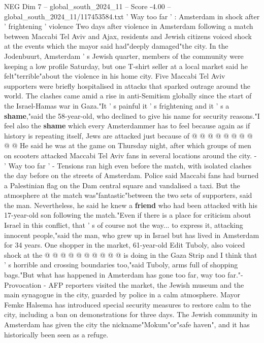 \begin{textsample}{NEG Dim 7 – global\_south\_2024\_11 – Score -4.00 – global\_south\_2024\_11/117453584.txt}  \label{ex:f7_neg_438}
' Way too far ' : Amsterdam in shock after ' frightening ' violence Two days after violence in Amsterdam following a match between Maccabi Tel Aviv and Ajax, residents and Jewish citizens voiced shock at the events which the mayor said had"deeply damaged"the city.
In the Jodenbuurt, Amsterdam ' s Jewish quarter, members of the community were keeping a low profile Saturday, but one T-shirt seller at a local market said he felt"terrible"about the violence in his home city.
Five Maccabi Tel Aviv supporters were briefly hospitalised in attacks that sparked outrage around the world.
The clashes came amid a rise in anti-Semitism globally since the start of the Israel-Hamas war in Gaza."It ' s painful it ' s frightening and it ' s a \textbf{shame},"said the 58-year-old, who declined to give his name for security reasons."I feel also the \textbf{shame} which every Amsterdammer has to feel because again as if history is repeating itself, Jews are attacked just because of @ @ @ @ @ @ @ @ @ @ He said he was at the game on Thursday night, after which groups of men on scooters attacked Maccabi Tel Aviv fans in several locations around the city. - ' Way too far ' - Tensions ran high even before the match, with isolated clashes the day before on the streets of Amsterdam.
Police said Maccabi fans had burned a Palestinian flag on the Dam central square and vandalised a taxi.
But the atmosphere at the match was"fantastic"between the two sets of supporters, said the man.
Nevertheless, he said he knew a \textbf{friend} who had been attacked with his 17-year-old son following the match."Even if there is a place for criticism about Israel in this conflict, that ' s of course not the way... to express it, attacking innocent people,"said the man, who grew up in Israel but has lived in Amsterdam for 34 years.
One shopper in the market, 61-year-old Edit Tuboly, also voiced shock at the @ @ @ @ @ @ @ @ @ @ is doing in the Gaza Strip and I think that ' s horrible and crossing boundaries too,"said Tuboly, arms full of shopping bags."But what has happened in Amsterdam has gone too far, way too far."- Provocation - AFP reporters visited the market, the Jewish museum and the main synagogue in the city, guarded by police in a calm atmosphere.
Mayor Femke Halsema has introduced special security measures to restore calm to the city, including a ban on demonstrations for three days.
The Jewish community in Amsterdam has given the city the nickname"Mokum"or"safe haven", and it has historically been seen as a refuge.

\end{textsample}

